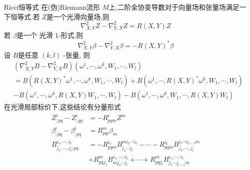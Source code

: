 \documentclass[../../几何与拓扑.tex]{subfiles}
\begin{document}
\begin{theorem}{Ricci恒等式}
    在(伪)Riemann流形 \(  M  \)上,二阶全协变导数对于向量场和张量场满足一下恒等式.若 \(  Z  \)是一个光滑向量场,则 \begin{equation}
       \nabla ^{2}_{X,Y}Z - \nabla ^{2}_{Y,X}Z=  R\left( X,Y \right)Z 
    \end{equation}
    若 \(  \beta   \)是一个 光滑 \(  1  \)-形式,则 \begin{equation}
        \nabla ^{2}_{X,Y}\beta - \nabla ^{2}_{Y,X}\beta =- R\left( X,Y \right)^{*}\beta  
    \end{equation}    设 \(  B  \)是任意 \(  \left( k,l \right)   \)  -张量, 则 \begin{equation}
        \begin{aligned}
            & \left(  \nabla ^{2}_{X,Y}B- \nabla ^{2}_{Y,X}B \right)\left(  \omega^1,\cdots,\omega^k , W_1,\cdots,W_l  \right)   \\ 
             & = B\left( R\left( X,Y \right)^{*} \omega ^{1} ,\cdots , \omega ^{k}, W_1,\cdots,W_l   \right) + B\left(  \omega ^{1},\cdots ,R\left( X,Y \right)^{*} \omega ^{k}, W_1,\cdots,W_l   \right) \\ 
              &-B\left(  \omega^1,\cdots,\omega^k ,R\left( X,Y \right)W_1,\cdots ,W_{l}  \right)-B\left(  \omega^1,\cdots,\omega^k ,W_1,\cdots ,R\left( X,Y \right)W_{l}  \right)  
              \end{aligned}
    \end{equation} 在光滑局部标价下,这些结论有分量形式 \[
  \begin{aligned}
    Z_{;pq}^{i}-Z_{;qp}^{i}&=-R_{pqm}^{i}Z^{m}\\ 
     \beta _{;pq}^{i}-\beta _{;pq}^{i}&= R_{pqi}^{m}\beta _{m}\\ 
      B_{ j_1,\cdots,j_l ;pq}^{ i_1,\cdots,i_k }& = -R_{pqm}^{i_1}B^{mi_2\cdots i_{k}}_{j_1\cdots j_{l}}-\cdots -R_{pqm}^{i_{k}}B_{ j_1,\cdots,j_l }^{i_1\cdots i_{k-1}m}\\ 
       & + R_{pq j_1}^{m}B_{mj_2\cdots j_{l}}^{ i_1,\cdots,i_k }+ \cdots + R_{pqj_{l}}^{m}B_{j_1\cdots j_{l-1}m}^{ i_1,\cdots,i_k }
  \end{aligned}
    \]
\end{theorem}
\end{document}
